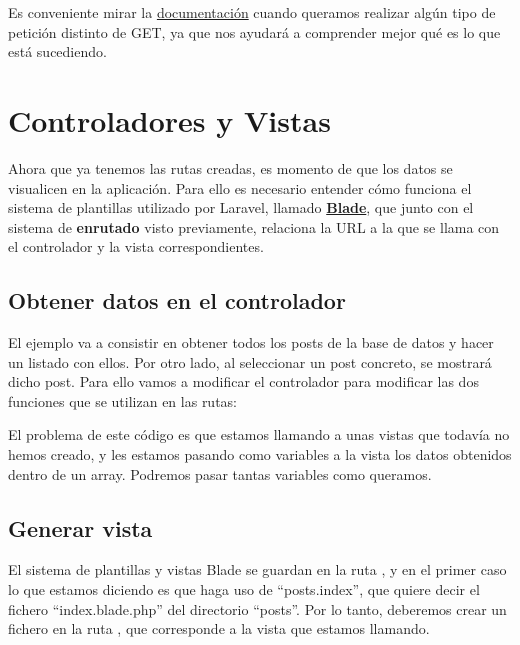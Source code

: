 Es conveniente mirar la \href{https://laravel.com/docs/10.x/routing}{documentación} cuando queramos realizar algún tipo de petición distinto de GET, ya que nos ayudará a comprender mejor qué es lo que está sucediendo.

\chapter{Controladores y Vistas}
Ahora que ya tenemos las rutas creadas, es momento de que los datos se visualicen en la aplicación. Para ello es necesario entender cómo funciona el sistema de plantillas utilizado por Laravel, llamado \textbf{\href{https://laravel.com/docs/10.x/blade}{Blade}}, que junto con el sistema de \textbf{enrutado} visto previamente, relaciona la URL a la que se llama con el controlador y la vista correspondientes.

\section{Obtener datos en el controlador}

El ejemplo va a consistir en obtener todos los posts de la base de datos y hacer un listado con ellos. Por otro lado, al seleccionar un post concreto, se mostrará dicho post. Para ello vamos a modificar el controlador para modificar las dos funciones que se utilizan en las rutas:

\begin{mycode}{Funciones modificadas en el controlador Post}{php}{}
<?php
// ...
use App\Models\Post;
// ...
class PostController extends Controller{
    public function index(){
        $posts = Post::orderBy('created_at');
        return view('posts.index',['posts' => $posts]);
    }
    //...
    public function show(Post $post){
        return view('posts.show',['post'=>$post]);
    }
\end{mycode}

El problema de este código es que estamos llamando a unas vistas que todavía no hemos creado, y les estamos pasando como variables a la vista los datos obtenidos dentro de un array. Podremos pasar tantas variables como queramos.


\section{Generar vista}

El sistema de plantillas y vistas Blade se guardan en la ruta , y en el primer caso lo que estamos diciendo es que haga uso de “posts.index”, que quiere decir el fichero “index.blade.php” del directorio “posts”. Por lo tanto, deberemos crear un fichero en la ruta , que corresponde a la vista que estamos llamando.

